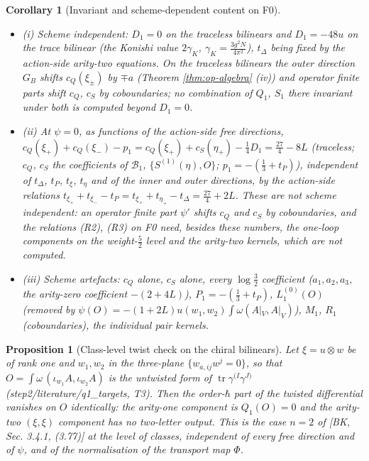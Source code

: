 \documentclass[11pt]{article}
\numberwithin{equation}{section}
\theoremstyle{plain}
\newtheorem{proposition}[theorem]{Proposition}
\newtheorem{corollary}[theorem]{Corollary}
\theoremstyle{definition}
\newcommand{\AV}{A|_V}
\begin{document}
\begin{corollary}[Invariant and scheme-dependent content on F0]
\label{cor:op-F0inv}
\begin{itemize}
\item (i) Scheme independent: $D_1=0$ on the traceless bilinears and $D_1=-48u$ on the trace bilinear (the Konishi value $2\gamma_K$, $\gamma_K=\tfrac{3g^2N}{4\pi^2}$), $t_\Delta$ being fixed by the action-side arity-two equations. On the traceless bilinears the outer direction $G_B$ shifts $c_Q(\xi_\pm)$ by $\mp a$ (Theorem \ref{thm:op-algebra} (iv)) and operator finite parts shift $c_Q$, $c_S$ by coboundaries; no combination of $Q_1$, $S_1$ there invariant under both is computed beyond $D_1=0$.
\item (ii) At $\psi=0$, as functions of the action-side free directions, $c_Q(\xi_+)+c_Q(\xi_-)-p_1=c_Q(\xi_+)+c_S(\eta_+)-\tfrac14D_1=\tfrac{27}4-8L$ (traceless; $c_Q$, $c_S$ the coefficients of $\mathcal B_1$, $\{S^{(1)}(\eta),O\}$; $p_1=-(\tfrac13+t_P)$), independent of $t_\Delta$, $t_P$, $t_\xi$, $t_\eta$ and of the inner and outer directions, by the action-side relations $t_{\xi_+}+t_{\xi_-}-t_P=t_{\xi_+}+t_{\eta_+}-t_\Delta=\tfrac{27}4+2L$. These are not scheme independent: an operator finite part $\psi'$ shifts $c_Q$ and $c_S$ by coboundaries, and the relations (R2), (R3) on F0 need, besides these numbers, the one-loop components on the weight-$\tfrac52$ level and the arity-two kernels, which are not computed.
\item (iii) Scheme artefacts: $c_Q$ alone, $c_S$ alone, every $\log\tfrac32$ coefficient ($a_1,a_2,a_3$, the arity-zero coefficient $-(2+4L)$), $P_1=-(\tfrac13+t_P)$, $L_1^{(0)}(O)$ (removed by $\psi(O)=-(1+2L)u(w_1,w_2)\int\omega(\AV,\AV)$), $M_1$, $R_1$ (coboundaries), the individual pair kernels.
\end{itemize}
\end{corollary}

\begin{proposition}[Class-level twist check on the chiral bilinears]
\label{prop:op-twistF0}
Let $\xi=u\otimes w$ be of rank one and $w_1,w_2$ in the three-plane $\{w_{a,ij}w^j=0\}$, so that $O=\int\omega\,(\iota_{w_1}A,\iota_{w_2}A)$ is the untwisted form of $\operatorname{tr}\gamma^{(I}\gamma^{J)}$ (step2/literature/q1\_targets, T3). Then the order-$\hbar$ part of the twisted differential vanishes on $O$ identically: the arity-one component is $Q_1(O)=0$ and the arity-two $(\xi,\xi)$ component has no two-letter output. This is the case $n=2$ of [BK, Sec. 3.4.1, (3.77)] at the level of classes, independent of every free direction and of $\psi$, and of the normalisation of the transport map $\Phi$.
\end{proposition}
\end{document}
